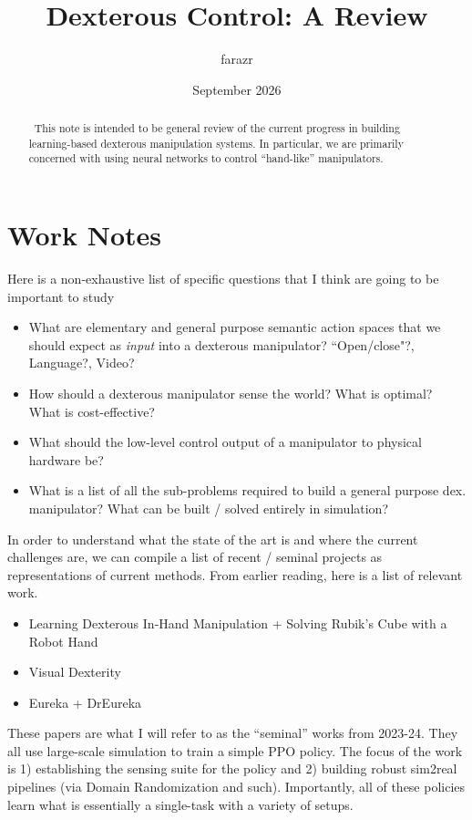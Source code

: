 \documentclass{article}
\title{Dexterous Control: A Review}
\author{farazr }
\date{September 2026}
\begin{document}
\maketitle

\begin{abstract}\
This note is intended to be general review of the current progress in building learning-based dexterous manipulation systems. In particular, we are primarily concerned with using neural networks to control ``hand-like'' manipulators. 
\end{abstract}

\section{Work Notes}

Here is a non-exhaustive list of specific questions that I think are going to be important to study
\begin{itemize}
    \item What are elementary and general purpose semantic action spaces that we should expect as \emph{input} into a dexterous manipulator? ``Open/close"?, Language?, Video?
    \item How should a dexterous manipulator sense the world? What is optimal? What is cost-effective?
    \item What should the low-level control output of a manipulator to physical hardware be?
    \item What is a list of all the sub-problems required to build a general purpose dex. manipulator? What can be built / solved entirely in simulation?
\end{itemize}

\noindent In order to understand what the state of the art is and where the current challenges are, we can compile a list of recent / seminal projects as representations of current methods. From earlier reading, here is a list of relevant work.
\begin{itemize}
    \item Learning Dexterous In-Hand Manipulation + Solving Rubik's Cube with a Robot Hand \citep{andrychowicz2020learning, openai2019rubiks}
    \item Visual Dexterity \citep{chen2023visual}
    \item Eureka + DrEureka \citep{ma2024eureka,ma2024dreureka}
\end{itemize}

\noindent These papers are what I will refer to as the ``seminal'' works from 2023-24. They all use large-scale simulation to train a simple PPO policy. The focus of the work is 1) establishing the sensing suite for the policy and 2) building robust sim2real pipelines (via Domain Randomization and such). Importantly, all of these policies learn what is essentially a single-task with a variety of setups.
\end{document}
